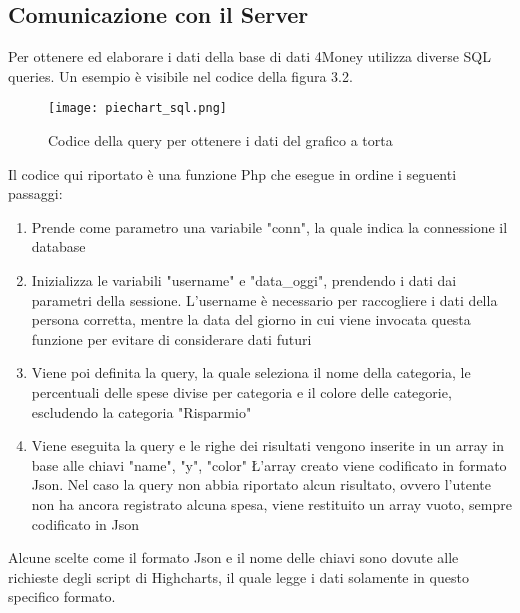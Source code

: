 \documentclass[binding=0.6cm, oneside, noexaminfo, italian]{sapthesis}
\begin{document}
\subsection{Comunicazione con il Server}
Per ottenere ed elaborare i dati della base di dati 4Money utilizza diverse SQL queries. Un esempio è visibile nel codice della figura 3.2.
\begin{figure}[h]
    \centering
    \texttt{[image: piechart\_sql.png]}
    \caption{Codice della query per ottenere i dati del grafico a torta}
    \label{fig:oiechart_code}
\end{figure}
Il codice qui riportato è una funzione Php che esegue in ordine i seguenti passaggi:
\begin{enumerate}
    \item Prende come parametro una variabile "conn", la quale indica la connessione il database
    \item Inizializza le variabili "username" e "data\_oggi", prendendo i dati dai parametri della sessione. L'username è necessario per raccogliere i dati della persona corretta, mentre la data del giorno in cui viene invocata questa funzione per evitare di considerare dati futuri
    \item Viene poi definita la query, la quale seleziona il nome della categoria, le percentuali delle spese divise per categoria e il colore delle categorie, escludendo la categoria "Risparmio"
    \item Viene eseguita la query e le righe dei risultati vengono inserite in un array in base alle chiavi "name", "y", "color"
    \L'array creato viene codificato in formato Json. Nel caso la query non abbia riportato alcun risultato, ovvero l'utente non ha ancora registrato alcuna spesa, viene restituito un array vuoto, sempre codificato in Json
\end{enumerate}
Alcune scelte come il formato Json e il nome delle chiavi sono dovute alle richieste degli script di Highcharts, il quale legge i dati solamente in questo specifico formato.
\end{document}
